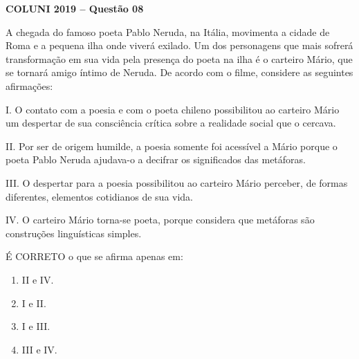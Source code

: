 \textbf{COLUNI 2019 -- Questão 08}\par\medskip A chegada do famoso poeta Pablo Neruda, na Itália, movimenta a cidade de Roma e a pequena ilha onde viverá exilado. Um dos personagens que mais sofrerá transformação em sua vida pela presença do poeta na ilha é o carteiro Mário, que se tornará amigo íntimo de Neruda. De acordo com o filme, considere as seguintes afirmações:

\par

I. O contato com a poesia e com o poeta chileno possibilitou ao carteiro Mário um despertar de sua consciência crítica sobre a realidade social que o cercava.

II. Por ser de origem humilde, a poesia somente foi acessível a Mário porque o poeta Pablo Neruda ajudava-o a decifrar os significados das metáforas.

III. O despertar para a poesia possibilitou ao carteiro Mário perceber, de formas diferentes, elementos cotidianos de sua vida.

IV. O carteiro Mário torna-se poeta, porque considera que metáforas são construções linguísticas simples.

\par

É CORRETO o que se afirma apenas em:

\par

\begin{enumerate}
\item II e IV.
\item I e II.
\item I e III.
\item III e IV.
\end{enumerate}

